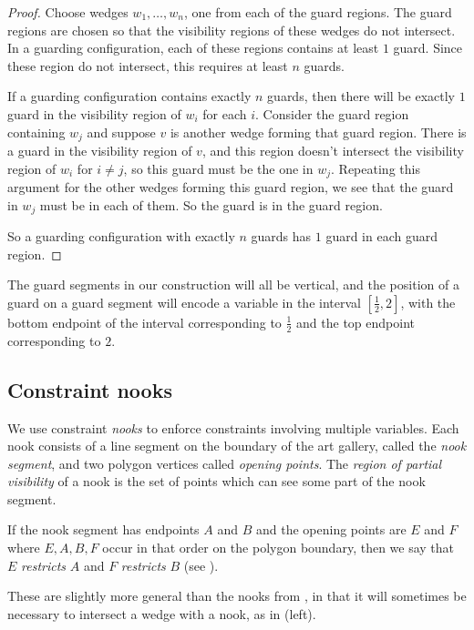 \documentclass[11pt]{article}
\theoremstyle{plain}
\theoremstyle{definition}
\numberwithin{theorem}{section}
\begin{document}
\begin{proof}
Choose wedges $w_1,\dots,w_n$, one from each of the guard regions. The guard regions are chosen so that the visibility regions of these wedges do not intersect. In a guarding configuration, each of these regions contains at least $1$ guard. Since these region do not intersect, this requires at least $n$ guards.

If a guarding configuration contains exactly $n$ guards, then there will be exactly $1$ guard in the visibility region of $w_i$ for each $i$. Consider the guard region containing $w_j$ and suppose $v$ is another wedge forming that guard region. There is a guard in the visibility region of $v$, and this region doesn't intersect the visibility region of $w_i$ for $i\ne j$, so this guard must be the one in $w_j$. Repeating this argument for the other wedges forming this guard region, we see that the guard in $w_j$ must be in each of them. So the guard is in the guard region.

So a guarding configuration with exactly $n$ guards has $1$ guard in each guard region.
\end{proof}

The guard segments in our construction will all be vertical, and the position of a guard on a guard segment will encode a variable in the interval $[\frac12, 2]$, with the bottom endpoint of the interval corresponding to $\frac12$ and the top endpoint corresponding to $2$. 

\subsection{Constraint nooks}

We use constraint \emph{nooks} to enforce constraints involving multiple variables. Each nook consists of a line segment on the boundary of the art gallery, called the \emph{nook segment}, and two polygon vertices called \emph{opening points}. The \emph{region of partial visibility} of a nook is the set of points which can see some part of the nook segment.

If the nook segment has endpoints $A$ and $B$ and the opening points are $E$ and $F$ where $E, A, B, F$ occur in that order on the polygon boundary, then we say that $E$ \emph{restricts} $A$ and $F$ \emph{restricts} $B$ (see ).

These are slightly more general than the nooks from \cite{ExistsRHardness}, in that it will sometimes be necessary to intersect a wedge with a nook, as in  (left).
\end{document}
